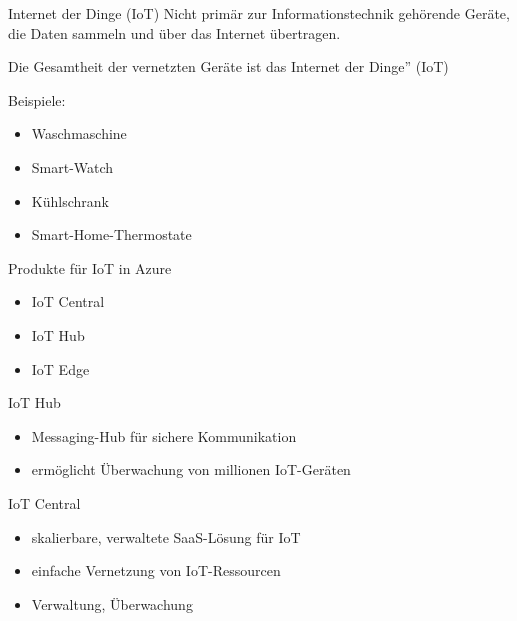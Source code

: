 
\begin{flashcard}[Definition]{Internet der Dinge (IoT)}
    Nicht primär zur Informationstechnik gehörende Geräte, die Daten sammeln und über das Internet übertragen.

    \vspace{5mm}
    Die Gesamtheit der vernetzten Geräte ist das Internet der Dinge'' (IoT)

    \vspace{5mm}
    Beispiele:
    \begin{itemize}
        \item Waschmaschine
        \item Smart-Watch
        \item Kühlschrank
        \item Smart-Home-Thermostate
    \end{itemize}

\end{flashcard}

\begin{flashcard}[\ ]{Produkte für IoT in Azure}
    \begin{itemize}
        \item IoT Central
        \item IoT Hub
        \item IoT Edge
    \end{itemize}

\end{flashcard}

\begin{flashcard}[Definition]{IoT Hub}
    \begin{itemize}
        \item Messaging-Hub für sichere Kommunikation
        \item ermöglicht Überwachung von millionen IoT-Geräten
    \end{itemize}
\end{flashcard}

\begin{flashcard}[Definition]{IoT Central}
    \begin{itemize}
        \item skalierbare, verwaltete SaaS-Lösung für IoT
        \item einfache Vernetzung von IoT-Ressourcen
        \item Verwaltung, Überwachung
    \end{itemize}
\end{flashcard}

